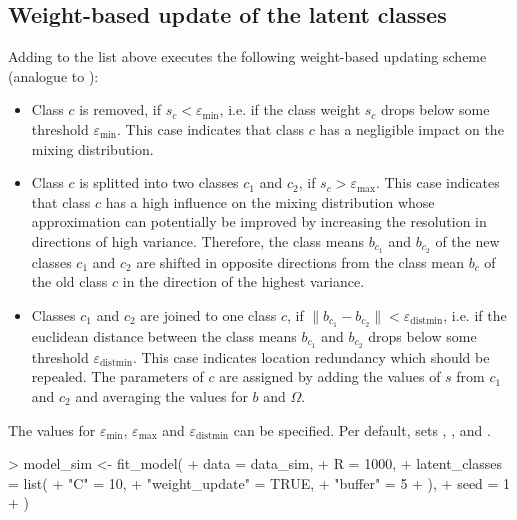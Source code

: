 \documentclass[article]{jss}
\begin{document}
\subsection{Weight-based update of the latent classes} \label{subsec:weight_update}

Adding  to the list  above executes the following weight-based updating scheme (analogue to \cite{Bauer:2019}):

\begin{itemize}
  \item Class $c$ is removed, if $s_c<\varepsilon_{\text{min}}$, i.e. if the class weight $s_c$ drops below some threshold $\varepsilon_{\text{min}}$. This case indicates that class $c$ has a negligible impact on the mixing distribution.
  \item Class $c$ is splitted into two classes $c_1$ and $c_2$, if $s_c>\varepsilon_\text{max}$. This case indicates that class $c$ has a high influence on the mixing distribution whose approximation can potentially be improved by increasing the resolution in directions of high variance. Therefore, the class means $b_{c_1}$ and $b_{c_2}$ of the new classes $c_1$ and $c_2$ are shifted in opposite directions from the class mean $b_c$ of the old class $c$ in the direction of the highest variance.
  \item Classes $c_1$ and $c_2$ are joined to one class $c$, if $\lVert b_{c_1} - b_{c_2} \rVert<\varepsilon_{\text{distmin}}$, i.e. if the euclidean distance between the class means $b_{c_1}$ and $b_{c_2}$  drops below some threshold $\varepsilon_{\text{distmin}}$. This case indicates location redundancy which should be repealed. The parameters of $c$ are assigned by adding the values of $s$ from $c_1$ and $c_2$ and averaging the values for $b$ and $\Omega$.
\end{itemize}

The values for $\varepsilon_{\text{min}}$, $\varepsilon_{\text{max}}$ and $\varepsilon_{\text{distmin}}$ can be specified. Per default,  sets  , , and .

\begin{Schunk}
\begin{Sinput}
> model_sim <- fit_model(
+    data = data_sim,
+    R = 1000,
+    latent_classes = list(
+      "C" = 10,
+      "weight_update" = TRUE,
+      "buffer" = 5
+      ),
+    seed = 1
+  )
\end{Sinput}
\end{Schunk}
\end{document}
